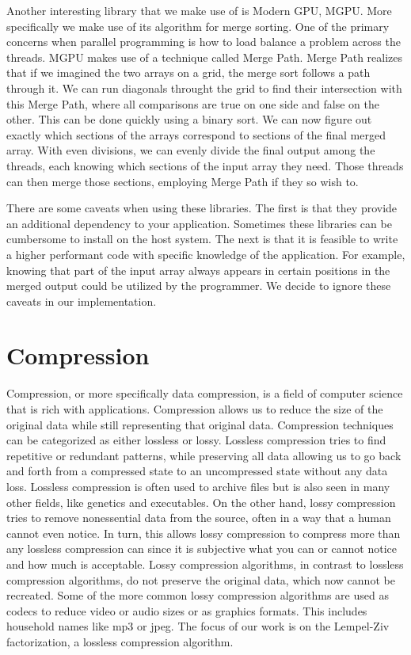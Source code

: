 Another interesting library that we make use of is Modern GPU, MGPU.
More specifically we make use of its algorithm for merge sorting.
One of the primary concerns when parallel programming is how to load balance a problem across the threads.
MGPU makes use of a technique called Merge Path\cite{odeh2012merge}.
Merge Path realizes that if we imagined the two arrays on a grid, the merge sort follows a path through it.
We can run diagonals throught the grid to find their intersection with this Merge Path, where all comparisons are true on one side and false on the other.
This can be done quickly using a binary sort.
We can now figure out exactly which sections of the arrays correspond to sections of the final merged array.
With even divisions, we can evenly divide the final output among the threads, each knowing which sections of the input array they need.
Those threads can then merge those sections, employing Merge Path if they so wish to.

There are some caveats when using these libraries.
The first is that they provide an additional dependency to your application.
Sometimes these libraries can be cumbersome to install on the host system.
The next is that it is feasible to write a higher performant code with specific knowledge of the application.
For example, knowing that part of the input array always appears in certain positions in the merged output could be utilized by the programmer.
We decide to ignore these caveats in our implementation.

\section{Compression}

Compression, or more specifically data compression, is a field of computer science that is rich with applications.
Compression allows us to reduce the size of the original data while still representing that original data.
Compression techniques can be categorized as either lossless or lossy.
Lossless compression tries to find repetitive or redundant patterns, while preserving all data allowing us to go back and forth from a compressed state to an uncompressed state without any data loss. 
Lossless compression is often used to archive files but is also seen in many other fields, like genetics and executables.
On the other hand, lossy compression tries to remove nonessential data from the source, often in a way that a human cannot even notice.
In turn, this allows lossy compression to compress more than any lossless compression can since it is subjective what you can or cannot notice and how much is acceptable.
Lossy compression algorithms, in contrast to lossless compression algorithms, do not preserve the original data, which now cannot be recreated.
Some of the more common lossy compression algorithms are used as codecs to reduce video or audio sizes or as graphics formats.
This includes household names like mp3 or jpeg.
The focus of our work is on the Lempel-Ziv factorization, a lossless compression algorithm.

